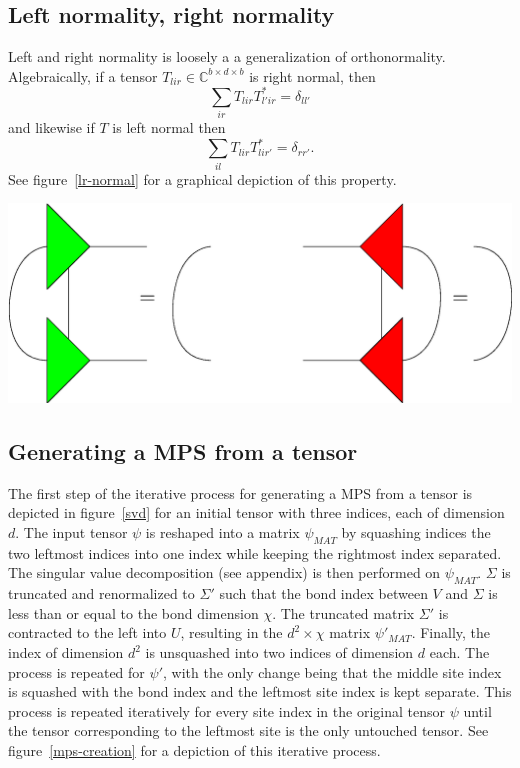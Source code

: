 \documentclass[12pt]{article}
\newenvironment{Figure}
  {\par\medskip\noindent\minipage{\linewidth}}
  {\endminipage\par\medskip}
\begin{document}
\begin{multicols}{2}
	\subsection{Left normality, right normality}
	Left and right normality is loosely a a generalization of
	orthonormality. Algebraically, if a tensor
	$T_{lir}\in\mathds{C}^{b\times d\times b}$
	is right normal, then
	$$\sum_{ir}T_{lir}T^*_{l'ir}=\delta_{ll'}$$
	and likewise if $T$ is left normal then
	$$\sum_{il}T_{lir}T^*_{lir'}=\delta_{rr'}.$$
	See figure~\ref{lr-normal} for a graphical depiction of this property.

	\begin{Figure}
		\center\includegraphics[width=.55\textwidth]{./Figures/lr_normal.eps}
		\label{lr-normal}
	\end{Figure}

	\subsection{Generating a MPS from a tensor}
	The first step of the iterative process for generating a MPS from a
	tensor is depicted in figure~\ref{svd} for an initial tensor with
	three indices, each of dimension $d$. The input tensor $\psi$ is
	reshaped into a matrix $\psi_{MAT}$ by squashing indices the two
	leftmost indices into one index while keeping the rightmost index
	separated. The singular value decomposition (see appendix) is then performed on
	$\psi_{MAT}$. $\Sigma$ is truncated and renormalized to $\Sigma'$
	such that the bond index between $V$ and $\Sigma$ is less than or
	equal to the bond dimension $\chi$. The truncated matrix $\Sigma'$
	is contracted to the left into $U$, resulting in the $d^2\times\chi$
	matrix $\psi'_{MAT}$. Finally, the index of dimension $d^2$ is
	unsquashed into two indices of dimension $d$ each. The process is
	repeated for $\psi'$, with the only change being that the middle
	site index is squashed with the bond index and the leftmost site
	index is kept separate. This process is repeated iteratively for
	every site index in the original tensor $\psi$ until the tensor
	corresponding to the leftmost site is the only untouched tensor.
	See figure~\ref{mps-creation} for a depiction of this iterative
	process.


\end{multicols}
\end{document}
